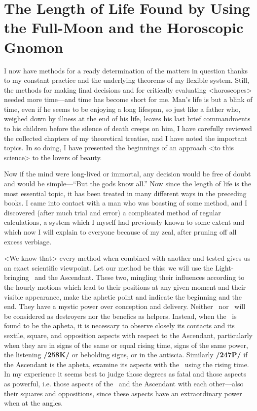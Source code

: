 \section{The Length of Life Found by Using the Full-Moon and the Horoscopic Gnomon}
I now have methods for a ready determination of the matters in question thanks to my constant practice and the underlying theorems of my flexible system. Still, the methods for making final decisions and for critically evaluating <horoscopes> needed more time—and time has become short for me. Man’s life is but a blink of time, even if he seems to be enjoying a long lifespan, so just like a father who, weighed down by illness at the end of his life, leaves his last brief commandments to his children before the silence of death creeps on him, I have carefully reviewed the collected chapters of my theoretical treatise, and I have noted the important topics. In so doing, I have presented the beginnings of an approach <to this science> to the lovers of beauty.

Now if the mind were long-lived or immortal, any decision would be free of doubt and would be simple—“But the gods know all.” Now since the length of life is the most essential topic, it has been treated in many different ways in the preceding books. I came into contact with a man who was boasting of some method, and I discovered (after much trial and error) a complicated method of regular calculations, a system which I myself had previously known to some extent and which now I will explain to everyone because of my zeal, after pruning off all excess verbiage. 

<We know that> every method when combined with another and tested gives us an exact scientific viewpoint. Let our method be this: we will use the Light-bringing \Moon\, and the Ascendant. These two,
mingling their influences according to the hourly motions which lead to their positions at any given moment and their visible appearance, make the aphetic point and indicate the beginning and the end. They have a mystic power over conception and delivery. Neither \Mars\, nor \Saturn\, will be considered as destroyers nor the benefics as helpers. Instead, when the \Moon\, is found to be the apheta, it is necessary to observe closely its contacts and its sextile, square, and opposition aspects with respect to the Ascendant, particularly when they are in signs of the same or equal rising time, signs of the same power, the listening \textbf{/258K/} or beholding signs, or in the antiscia. Similarly \textbf{/247P/} if the Ascendant is the apheta, examine its aspects with the \Moon\, using the rising time. In my experience it seems best to judge those degrees as fatal and those aspects as powerful, i.e. those aspects of the \Moon\, and the Ascendant with each other—also their squares and oppositions, since these aspects have an extraordinary power when at the angles.

